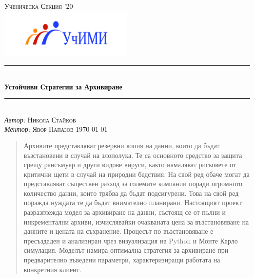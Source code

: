 \documentclass[11pt, a4paper]{article}
\theoremstyle{definition}
\begin{document}
\begin{titlepage}
	\newcommand{\HRule}{\rule{\linewidth}{0.5mm}}
	\centering
	\textsc{\LARGE Ученическа Секция '20}\\
	\includegraphics[width=0.5\textwidth]{Uchimi_logo}\\
	\HRule\\[1 cm]
	{\huge\bfseries Устойчиви Стратегии за Архивиране}\\[1 cm]
	\HRule\\
	\vfill
			\Large
			\textit{Автор:}
			 \textsc{Никола Стайков}\\
             \vspace{2cm}
			\Large
			\textit{Ментор:}
            \textsc{Явор Папазов}
    \vfill	
	{\large\today}   
	\vfill
\end{titlepage}

\tableofcontents
\newpage
\begin{abstract}
		Архивите представляват резервни копия на данни, които да бъдат възстановени в случай на злополука. Те са основното средство за защита срещу рансъмуер и други видове вируси, както намаляват рисковете от критични щети в случай на природни бедствия. На свой ред обаче могат да представляват съществен разход за големите компании поради огромното количество данни, които трябва да бъдат подсигурени. Това на свой ред поражда нуждата те да бъдат внимателно планирани. Настоящият проект разразглежда модел за архивиране на данни, състоящ се от пълни и инкрементални архиви, изчислявайки очакваната цена за възстановяване на данните и цената на съхранение. Процесът по възстановяване е пресъздаден и анализиран чрез визуализация на Python и Монте Карло симулация. Моделът намира оптимална стратегия за архивиране при предварително въведени параметри, характеризиращи работата на конкретния клиент.
\end{abstract}
\end{document}

